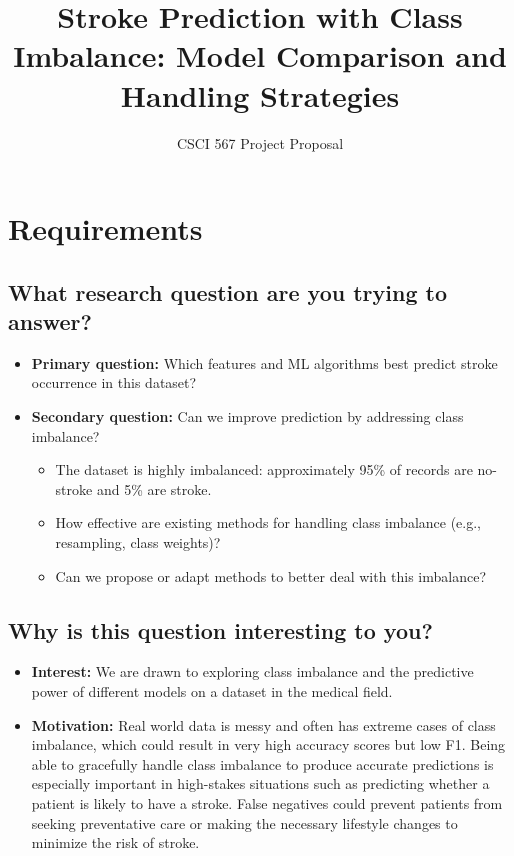 \documentclass[11pt,a4paper]{article}
\title{Stroke Prediction with Class Imbalance: Model Comparison and Handling Strategies}
\author{CSCI 567 Project Proposal}
\date{}
\begin{document}
\maketitle
\vspace{-1em}

\section*{Requirements}

\subsection*{What research question are you trying to answer?}
\begin{itemize}[leftmargin=*]
  \item \textbf{Primary question:} Which features and ML algorithms best predict stroke occurrence in this dataset?
  \item \textbf{Secondary question:} Can we improve prediction by addressing class imbalance?
  \begin{itemize}
    \item The dataset is highly imbalanced: approximately 95\% of records are no-stroke and 5\% are stroke.
    \item How effective are existing methods for handling class imbalance (e.g., resampling, class weights)?
    \item Can we propose or adapt methods to better deal with this imbalance?
  \end{itemize}
\end{itemize}

\subsection*{Why is this question interesting to you?}
\begin{itemize}[leftmargin=*]
  \item \textbf{Interest:} We are drawn to exploring class imbalance and the predictive power of different models on a dataset in the medical field.
  \item \textbf{Motivation:} Real world data is messy and often has extreme cases of class imbalance, which could result in very high accuracy scores but low F1. Being able to gracefully handle class imbalance to produce accurate predictions is especially important in high-stakes situations such as predicting whether a patient is likely to have a stroke. False negatives could prevent patients from seeking preventative care or making the necessary lifestyle changes to minimize the risk of stroke.
\end{itemize}
\end{document}
